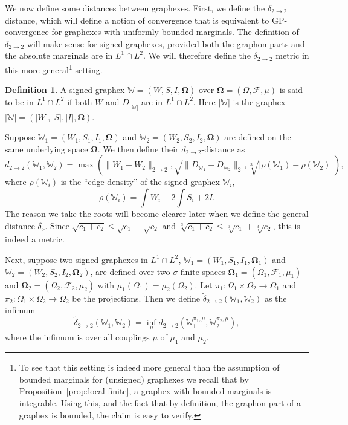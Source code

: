 \documentclass{amsart}
\numberwithin{equation}{section}
\numberwithin{figure}{section}
\theoremstyle{definition}
\newtheorem{definition}[theorem]{Definition}
\theoremstyle{remark}
\newcommand{\bOmega}{{\mathbf{\Omega}}}
\newcommand{\cW}{\mathbb{W}}
\newcommand{\cF}{\mathcal{F}}
\newcommand{\deltt}{\delta_{2\to 2}}
\def\d22{d_{2\to 2}}
\def\delGP{\delta_\diamond}
\def\tdel22{{\widetilde{\delta}}_{2\to 2}}
\begin{document}
We now define some distances between graphexes. First, we define the $\deltt$
distance, which will define a notion of convergence that is equivalent to
GP-convergence for graphexes with uniformly bounded marginals. The definition
of $\deltt$ will make sense for signed graphexes, provided both the graphon
parts and the absolute marginals are in $L^1\cap L^2$. We will therefore
define the $\deltt$ metric in this more general\footnote{To see that this
setting is indeed more general than the assumption of bounded marginals for
(unsigned) graphexes we recall that by Proposition~\ref{prop:local-finite}, a
graphex with bounded marginals is integrable. Using this, and the fact that
by definition, the graphon part of a graphex is bounded, the claim is easy to
verify.} setting.
\begin{definition}
A signed graphex $\cW=(W,S,I,\bOmega)$ over $\bOmega=(\Omega,\cF,\mu)$ is
said to be in $L^1\cap L^2$ if both $W$ and $D|_{\cW|}$ are in $L^1\cap L^2$.
Here $|\cW|$ is the graphex $|\cW|=(|W|,|S|,|I|,\bOmega)$.
\end{definition}

Suppose $\cW_1=(W_1,S_1,I_1,\bOmega)$ and $\cW_2= (W_2,S_2,I_2,\bOmega)$ are
defined on the same underlying space $\bOmega$. We then define their
$\d22$-distance as
\begin{equation}\label{d22-def}
\d22(\cW_1,\cW_2)= \max\left( \|W_1-W_2\|_{2 \rightarrow 2},
\sqrt{\|D_{\cW_1}-D_{\cW_2}\|_2},\sqrt[3]{\left|
\rho(\cW_1)-\rho(\cW_2)
\right|}\right),
\end{equation}
where $\rho(\cW_i)$ is the ``edge density'' of the signed graphex $\cW_i$,
\begin{equation}
\label{rho-of-W-def} \rho(\cW_i)=\int W_i +2 \int S_i + 2I.
\end{equation}
The reason we take the roots will become clearer later when we define the
general distance $\delGP$. Since $\sqrt{c_1+c_2} \le \sqrt{c_1}+\sqrt{c_2}$
and $\sqrt[3]{c_1+c_2} \le \sqrt[3]{c_1}+\sqrt[3]{c_2}$, this is indeed a
metric.

Next, suppose two signed graphexes in $L^1\cap L^2$,
$\cW_1=(W_1,S_1,I_1,\bOmega_1)$ and $\cW_2= (W_2,S_2,I_2,\bOmega_2)$, are
defined over two $\sigma$-finite spaces $\bOmega_1=(\Omega_1,\cF_1,\mu_1)$
and $\bOmega_2=(\Omega_2,\cF_2,\mu_2)$ with
$\mu_1(\Omega_1)=\mu_2(\Omega_2)$. Let $\pi_1\colon \Omega_1 \times \Omega_2
\rightarrow \Omega_1$ and $\pi_2\colon \Omega_1 \times \Omega_2 \rightarrow
\Omega_2$ be the projections. Then we define $\tdel22(\cW_1,\cW_2)$ as the
infimum
\begin{equation}\label{tdel22-def}
\tdel22(\cW_1,\cW_2)
=\inf_\mu\d22(\cW_1^{\pi_1,\mu},\cW_2^{\pi_2,\mu}),
\end{equation}
where the infimum is over all couplings $\mu$ of $\mu_1$ and $\mu_2$.
\end{document}
